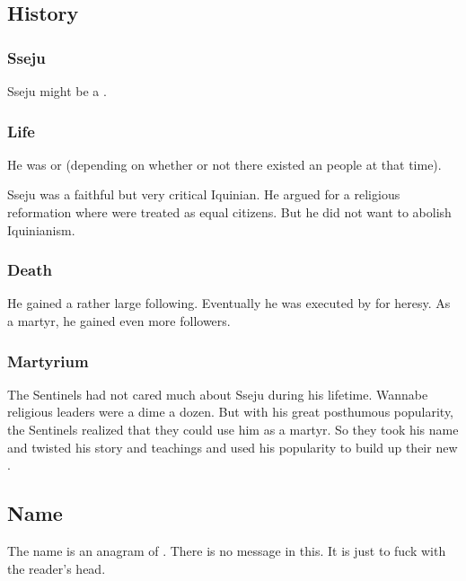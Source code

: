 \subsection{History}





\subsubsection{Sseju}
Sseju might be a \sphyle.





\subsubsection{Life}
He was  or  (depending on whether or not there existed an \quo{\Ortaican} people at that time). 

Sseju was a faithful but very critical Iquinian.
He argued for a religious reformation where \scathae were treated as equal citizens. 
But he did not want to abolish Iquinianism.





\subsubsection{Death}
He gained a rather large following. 
Eventually he was executed by \Caliph \VizicarDurasRespina for heresy. 
As a martyr, he gained even more followers. 





\subsubsection{Martyrium}
The Sentinels had not cared much about Sseju during his lifetime. 
Wannabe religious leaders were a dime a dozen.
But with his great posthumous popularity, the Sentinels realized that they could use him as a martyr.
So they took his name and twisted his story and teachings and used his popularity to build up their new . 









\subsection{Name}
The name  is an anagram of .
There is no message in this.
It is just to fuck with the reader's head. 
























